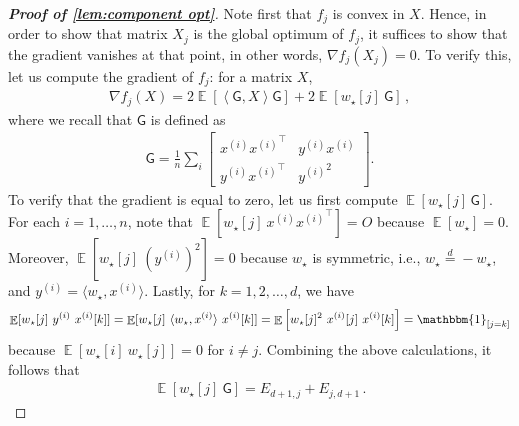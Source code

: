 \documentclass{article}
\DeclareMathOperator{\E}{\mathbb{E}}
\newcommand{\wstar}{w_\star}
\newcommand{\tx}[1]{x^{(#1)}}
\newcommand{\ty}[1]{y^{(#1)}}
\newcommand{\MM}{\mathsf{G}}
\newcommand{\inp}[2]{\left \langle #1,#2\right\rangle}
\begin{document}
\begin{proof}[{\bf Proof of \autoref{lem:component opt}}] 
Note first that $f_j$ is convex in $X$.
Hence, in order to show that matrix $X_j$ is  the global optimum of $f_j$, it suffices to show that the gradient vanishes at that point, in other words, $\nabla f_j(X_j)  = 0$. 
To verify this,  let us compute the gradient of $f_j$: for a matrix $X$, 
\begin{align}
\nabla f_j(X)  = 2\E \left[ \inp{\MM}{X} \MM \right] + 2 \E \left[\wstar[j] \ 
\MM \right]\,,
\end{align}
where we recall that $\MM$ is defined as  
\begin{align}
\MM = \frac{1}{n}\sum_i\begin{bmatrix}
\tx{i} {\tx{i}}^\top & \ty{i} \tx{i}\\
\ty{i} {\tx{i}}^\top & {\ty{i}}^2
\end{bmatrix}.
\end{align}
To verify that the gradient is equal to zero, let us first compute $\E \left[ \wstar[j] \,
\MM \right]$.  
For each $i=1,\dots,n$, note that $\E[\wstar[j] \ \tx{i} {\tx{i}}^\top] =O$ because $\E[\wstar]=0$.
Moreover, $\E[\wstar[j] \ (\ty{i})^2] =0$ because $\wstar$ is symmetric, i.e., $\wstar \overset{d}{=} -\wstar$, and $\ty{i} =\langle{\wstar},{\tx{i}} \rangle$. 
Lastly, for $k=1,2,\dots, d$, we have 
\begin{align} \label{exp:wj}
\E[\wstar[j]  \ {\ty{i}} \ {\tx{i}}[k]] =\E[\wstar[j] \ \langle{\wstar},{\tx{i}} \rangle \ {\tx{i}}[k]] =   \E\left[ \wstar[j]^2 \  {\tx{i}}[j] \  {\tx{i}}[k] \right]  = \mathbbm{1}_{[j=k]}     
\end{align}
because $\E[\wstar[i] \ \wstar[j]]=0$ for $i\neq j$. Combining the above calculations, it follows that
\begin{align} \label{exp:second}
\boxed{ \E \left[ \wstar[j] \ 
\MM \right]  =  E_{d+1,j} + E_{j,d+1}\,.} 
\end{align}


\end{proof}
\end{document}
